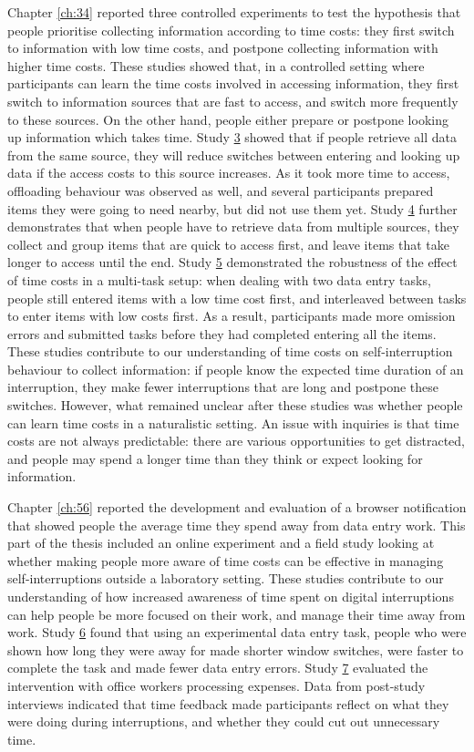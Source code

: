 Chapter \ref{ch:34} reported three controlled experiments to test the hypothesis that people prioritise collecting information according to time costs: they first switch to information with low time costs, and postpone collecting information with higher time costs. These studies showed that, in a controlled setting where participants can learn the time costs involved in accessing information, they first switch to information sources that are fast to access, and switch more frequently to these sources. On the other hand, people either prepare or postpone looking up information which takes time. Study \hyperref[st:Study3]{3} showed that if people retrieve all data from the same source, they will reduce switches between entering and looking up data if the access costs to this source increases. As it took more time to access, offloading behaviour was observed as well, and several participants prepared items they were going to need nearby, but did not use them yet. Study \hyperref[st:Study4]{4} further demonstrates that when people have to retrieve data from multiple sources, they collect and group items that are quick to access first, and leave items that take longer to access until the end. Study \hyperref[st:Study5]{5} demonstrated the robustness of the effect of time costs in a multi-task setup: when dealing with two data entry tasks, people still entered items with a low time cost first, and interleaved between tasks to enter items with low costs first. As a result, participants made more omission errors and submitted tasks before they had completed entering all the items. These studies contribute to our understanding of time costs on self-interruption behaviour to collect information: if people know the expected time duration of an interruption, they make fewer interruptions that are long and postpone these switches. However, what remained unclear after these studies was whether people can learn time costs in a naturalistic setting. An issue with inquiries is that time costs are not always predictable: there are various opportunities to get distracted, and people may spend a longer time than they think or expect looking for information.

Chapter \ref{ch:56} reported the development and evaluation of a browser notification that showed people the average time they spend away from data entry work. This part of the thesis included an online experiment and a field study looking at whether making people more aware of time costs can be effective in managing self-interruptions outside a laboratory setting. These studies contribute to our understanding of how increased awareness of time spent on digital interruptions can help people be more focused on their work, and manage their time away from work. Study \hyperref[st:Study6]{6} found that using an experimental data entry task, people who were shown how long they were away for made shorter window switches, were faster to complete the task and made fewer data entry errors. Study \hyperref[st:Study7]{7} evaluated the intervention with office workers processing expenses. Data from post-study interviews indicated that time feedback made participants reflect on what they were doing during interruptions, and whether they could cut out unnecessary time. 

